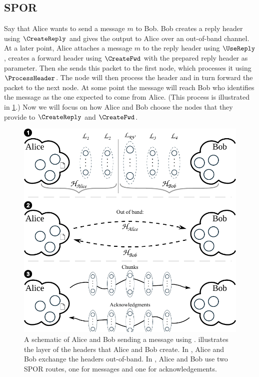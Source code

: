 

\subsection{\Acf*{SPOR}}%
\label{SPOR}%
\label{sec:SPOR}%
\label{sec:message_passing}%

Say that Alice wants to send a message \(m\) to Bob.
Bob creates a reply header using \(\CreateReply\) and gives the output to Alice 
over an out-of-band channel.
At a later point, Alice attaches a message \(m\) to the reply header using 
\(\UseReply\), creates a forward header using \(\CreateFwd\) with the prepared 
reply header as parameter.  
Then she sends this packet to the first node, which processes it using 
\(\ProcessHeader\).
The node will then process the header and in turn forward the packet to the 
next node.
At some point the message will reach Bob who identifies the message as the 
one expected to come from Alice.
(This process is illustrated in \cref{fig:file-transfer}.)
Now we will focus on how Alice and Bob choose the nodes that they provide to 
\(\CreateReply\) and \(\CreateFwd\).

\begin{figure}
  \includegraphics[width=\linewidth]{figures/file_transfer_v2.pdf}
  \caption{\label{fig:file-transfer}%
    A schematic of Alice and Bob sending a message using \name.
     illustrates the layer of the headers that Alice and Bob create.
    In , Alice and Bob exchange the headers out-of-band.
    In , Alice and Bob use two \ac{SPOR} routes, one for messages and 
    one for acknowledgements.
  }
\end{figure}

